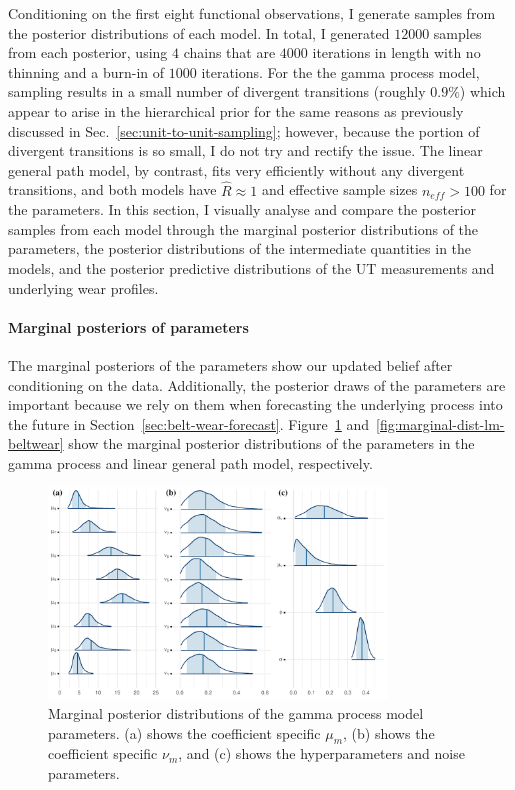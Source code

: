 Conditioning on the first eight functional observations, I generate samples from the posterior distributions of each model. In total, I generated $12000$ samples from each posterior, using $4$ chains that are $4000$ iterations in length with no thinning and a burn-in of $1000$ iterations. For the the gamma process model, sampling results in a small number of divergent transitions (roughly $0.9\%$) which appear to arise in the hierarchical prior for the same reasons as previously discussed in Sec.~\ref{sec:unit-to-unit-sampling}; however, because the portion of divergent transitions is so small, I do not try and rectify the issue. The linear general path model, by contrast, fits very efficiently without any divergent transitions, and both models have $\hat{R} \approx 1$ and effective sample sizes $n_{eff} > 100$ for the parameters. In this section, I visually analyse and compare the posterior samples from each model through the marginal posterior distributions of the parameters, the posterior distributions of the intermediate quantities in the models, and the posterior predictive distributions of the UT measurements and underlying wear profiles.

\paragraph{Marginal posteriors of parameters} 
The marginal posteriors of the parameters show our updated belief after conditioning on the data. Additionally, the posterior draws of the parameters are important because we rely on them when forecasting the underlying process into the future in Section~\ref{sec:belt-wear-forecast}. Figure~\ref{fig:marginal-dist-gp-beltwear} and~\ref{fig:marginal-dist-lm-beltwear} show the marginal posterior distributions of the parameters in the gamma process and linear general path model, respectively.

\begin{figure}
  \centering
  \includegraphics[width=0.8\textwidth]{figures/ch-6/marginal_post_gp.pdf}
  \caption{Marginal posterior distributions of the gamma process model parameters. (a) shows the coefficient specific $\mu_m$, (b) shows the coefficient specific $\nu_m$, and (c) shows the hyperparameters and noise parameters.}
  \label{fig:marginal-dist-gp-beltwear}
\end{figure}

